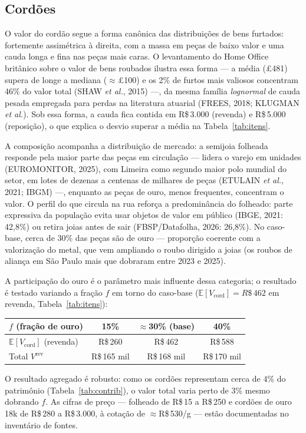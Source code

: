 \documentclass[11pt,a4paper]{article}
\newcommand{\reais}[1]{R\$\,#1}
\begin{document}
\subsection{Cordões}
O valor do cordão segue a forma canônica das distribuições de bens furtados: fortemente
assimétrica à direita, com a massa em peças de baixo valor e uma cauda longa e fina nas peças mais
caras. O levantamento do Home Office britânico sobre o valor de bens roubados ilustra essa forma
--- a média (\pounds481) supera de longe a mediana ($\approx$\pounds100) e os 2\% de furtos mais
valiosos concentram 46\% do valor total (SHAW \emph{et al.}, 2015) ---, da mesma família
\emph{lognormal} de cauda pesada empregada para perdas na literatura atuarial (FREES, 2018; KLUGMAN
\emph{et al.}). Sob essa forma, a cauda fica contida em \reais{3.000} (revenda) e \reais{5.000}
(reposição), o que explica o desvio superar a média na Tabela~\ref{tab:itens}.

A composição acompanha a distribuição de mercado: a semijoia folheada responde pela maior parte das
peças em circulação --- lidera o varejo em unidades (EUROMONITOR, 2025), com Limeira como segundo
maior polo mundial do setor, em lotes de dezenas a centenas de milhares de peças (ETULAIN
\emph{et al.}, 2021; IBGM) ---, enquanto as peças de ouro, menos frequentes, concentram o valor. O
perfil do que circula na rua reforça a predominância do folheado: parte expressiva da população
evita usar objetos de valor em público (IBGE, 2021: 42,8\%) ou retira joias antes de sair
(FBSP/Datafolha, 2026: 26,8\%). No caso-base, cerca de 30\% das peças são de ouro --- proporção
coerente com a valorização do metal, que vem ampliando o roubo dirigido a joias (os roubos de
aliança em São Paulo mais que dobraram entre 2023 e 2025).

A participação do ouro é o parâmetro mais influente dessa categoria; o resultado é testado variando
a fração $f$ em torno do caso-base ($\mathbb{E}[V_{\text{cord}}]=\reais{462}$ em revenda,
Tabela~\ref{tab:itens}):
\begin{center}\small
\begin{tabular}{lccc}
\toprule
$f$ (fração de ouro) & 15\% & $\approx$30\% (base) & 40\% \\
\midrule
$\mathbb{E}[V_{\text{cord}}]$ (revenda) & \reais{260} & \reais{462} & \reais{588} \\
Total $V^{\text{rev}}$ & \reais{165} mil & \reais{168} mil & \reais{170} mil \\
\bottomrule
\end{tabular}
\end{center}
O resultado agregado é robusto: como os cordões representam cerca de 4\% do patrimônio
(Tabela~\ref{tab:contrib}), o valor total varia perto de 3\% mesmo dobrando $f$. As cifras de preço
--- folheado de \reais{15} a \reais{250} e cordões de ouro 18k de \reais{280} a \reais{3.000}, à
cotação de $\approx$\reais{530}/g --- estão documentadas no inventário de fontes.
\end{document}

